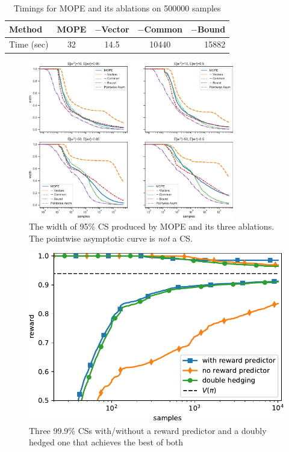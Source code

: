 \begin{table}[h!]
\caption{Timings for MOPE and its ablations on 500000 samples}
\label{tab:timings}
\centering
\begin{small}
\begin{sc}
\begin{tabular}{lcccr}
\toprule
Method & MOPE & $-$Vector & $-$Common & $-$Bound \\
\midrule
Time (sec)& 32     & 14.5  & 10440 & 15882 \\
\bottomrule
\end{tabular}
\end{sc}
\end{small}
\end{table}

\begin{figure}
    \centering
    \includegraphics[width=0.8\textwidth]{width}
    \caption{The width of 95\% CS produced by MOPE and its three ablations.
    The pointwise asymptotic curve is \emph{not} a CS.}
    \label{fig:width}
\end{figure}

\begin{figure}
    \centering
    \includegraphics[width=0.75\linewidth]{predictor}
    \caption{Three 99.9\% CSs with/without a reward predictor and a doubly hedged one that achieves the best of both}
    \label{fig:predictor}
\end{figure}

